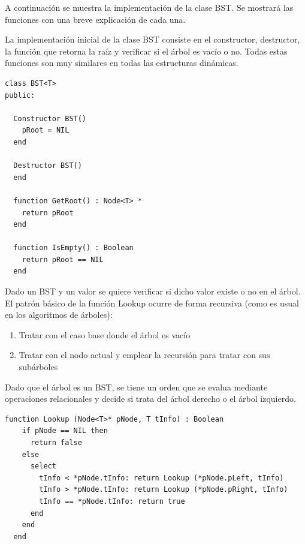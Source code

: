 A continuación se muestra la implementación de la clase BST. Se mostrará las funciones con una breve explicación de cada una.

La implementación inicial de la clase BST consiste en el constructor, destructor, la función que retorna la raíz y verificar si el árbol es vacío o no. Todas estas funciones son muy similares en todas las estructuras dinámicas.

\begin{lstlisting}[upquote=true, language=pseudo]
class BST<T>
public:
  
  Constructor BST()
    pRoot = NIL
  end
  
  Destructor BST()
  end
  
  function GetRoot() : Node<T> *
    return pRoot
  end
  
  function IsEmpty() : Boolean 
    return pRoot == NIL
  end
\end{lstlisting}

Dado un BST y un valor se quiere verificar si dicho valor existe o no en el árbol. El patrón básico de la función Lookup ocurre de forma recursiva (como es usual en los algoritmos de árboles): 
\begin{enumerate}
\item Tratar con el caso base donde el árbol es vacío
\item Tratar con el nodo actual y emplear la recursión para tratar con sus subárboles
\end{enumerate}

Dado que el árbol es un BST, se tiene un orden que se evalua mediante operaciones relacionales y decide si trata del árbol derecho o el árbol izquierdo.

\begin{lstlisting}[upquote=true, language=pseudo]
  function Lookup (Node<T>* pNode, T tInfo) : Boolean
    if pNode == NIL then
      return false
    else
      select
        tInfo < *pNode.tInfo: return Lookup (*pNode.pLeft, tInfo)
        tInfo > *pNode.tInfo: return Lookup (*pNode.pRight, tInfo)
        tInfo == *pNode.tInfo: return true
      end
    end
  end
\end{lstlisting}

